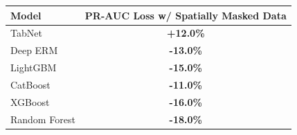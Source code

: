 \begin{table}[H]
\centering
\begin{tabular}{lc}
\toprule
\textbf{Model} & \textbf{PR-AUC Loss w/ Spatially Masked Data} \\
\midrule
TabNet & \textbf{+12.0\%} \\
Deep ERM & \textbf{-13.0\%} \\
LightGBM & \textbf{-15.0\%} \\
CatBoost & \textbf{-11.0\%} \\
XGBoost & \textbf{-16.0\%} \\
Random Forest & \textbf{-18.0\%} \\
\bottomrule
\end{tabular}
\end{table}